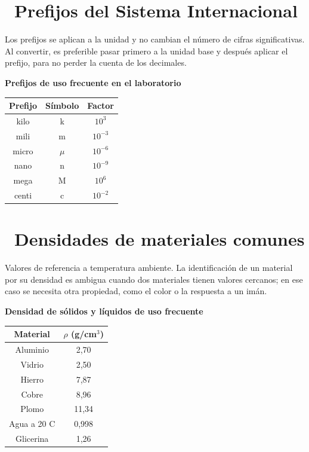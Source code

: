 \documentclass[11pt,a4paper]{article}
\newcommand{\iconotexto}[2]{\textcolor{cyanNeon}{\faIcon{#1}}~#2}
\begin{document}
\section{\iconotexto{paperclip}{Prefijos del Sistema Internacional}}

Los prefijos se aplican a la unidad y no cambian el número de cifras significativas. Al convertir, es preferible pasar primero a la unidad base y después aplicar el prefijo, para no perder la cuenta de los decimales.

\begin{center}
\begin{minipage}{\linewidth}
\centering
{\small
\textbf{Prefijos de uso frecuente en el laboratorio}\par\smallskip
\begin{tabular}{@{}ccc@{}}
\toprule
Prefijo & Símbolo & Factor \\
\midrule
kilo & k & $10^{3}$ \\
mili & m & $10^{-3}$ \\
micro & $\mu$ & $10^{-6}$ \\
nano & n & $10^{-9}$ \\
mega & M & $10^{6}$ \\
centi & c & $10^{-2}$ \\
\bottomrule
\end{tabular}
}
\end{minipage}
\end{center}

\section{\iconotexto{paperclip}{Densidades de materiales comunes}}

Valores de referencia a temperatura ambiente. La identificación de un material por su densidad es ambigua cuando dos materiales tienen valores cercanos; en ese caso se necesita otra propiedad, como el color o la respuesta a un imán.

\begin{center}
\begin{minipage}{\linewidth}
\centering
{\small
\textbf{Densidad de sólidos y líquidos de uso frecuente}\par\smallskip
\begin{tabular}{@{}cc@{}}
\toprule
Material & $\rho$ (g/cm$^3$) \\
\midrule
Aluminio & 2,70 \\
Vidrio & 2,50 \\
Hierro & 7,87 \\
Cobre & 8,96 \\
Plomo & 11,34 \\
Agua a 20 C & 0,998 \\
Glicerina & 1,26 \\
\bottomrule
\end{tabular}
}
\end{minipage}
\end{center}
\end{document}

